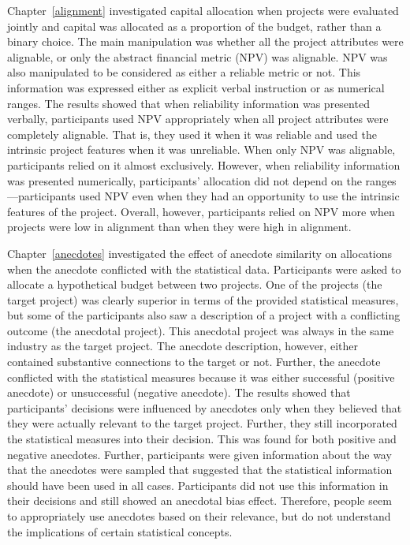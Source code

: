 \documentclass[a4paper, nobind]{templates/ociamthesis}
\theoremstyle{definition}
\theoremstyle{definition}
\theoremstyle{definition}
\theoremstyle{definition}
\theoremstyle{remark}
\begin{document}
Chapter~\ref{alignment} investigated capital allocation when projects were
evaluated jointly and capital was allocated as a proportion of the budget,
rather than a binary choice. The main manipulation was whether all the project
attributes were alignable, or only the abstract financial metric (NPV) was
alignable. NPV was also manipulated to be considered as either a reliable metric
or not. This information was expressed either as explicit verbal instruction or
as numerical ranges. The results showed that when reliability information was
presented verbally, participants used NPV appropriately when all project
attributes were completely alignable. That is, they used it when it was reliable
and used the intrinsic project features when it was unreliable. When only NPV
was alignable, participants relied on it almost exclusively. However, when
reliability information was presented numerically, participants' allocation did
not depend on the ranges---participants used NPV even when they had an
opportunity to use the intrinsic features of the project. Overall, however,
participants relied on NPV more when projects were low in alignment than when
they were high in alignment.

Chapter~\ref{anecdotes} investigated the effect of anecdote similarity on
allocations when the anecdote conflicted with the statistical data. Participants
were asked to allocate a hypothetical budget between two projects. One of the
projects (the target project) was clearly superior in terms of the provided
statistical measures, but some of the participants also saw a description of a
project with a conflicting outcome (the anecdotal project). This anecdotal
project was always in the same industry as the target project. The anecdote
description, however, either contained substantive connections to the target or
not. Further, the anecdote conflicted with the statistical measures because it
was either successful (positive anecdote) or unsuccessful (negative anecdote).
The results showed that participants' decisions were influenced by anecdotes
only when they believed that they were actually relevant to the target project.
Further, they still incorporated the statistical measures into their decision.
This was found for both positive and negative anecdotes. Further, participants
were given information about the way that the anecdotes were sampled that
suggested that the statistical information should have been used in all cases.
Participants did not use this information in their decisions and still showed an
anecdotal bias effect. Therefore, people seem to appropriately use anecdotes
based on their relevance, but do not understand the implications of certain
statistical concepts.
\end{document}
